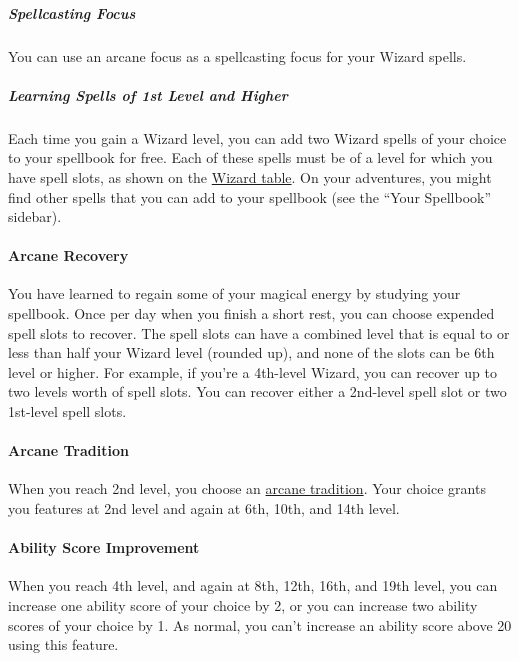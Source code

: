 \subparagraph{Spellcasting Focus}\label{_spellcasting_focus_3}

You can use an arcane focus as a spellcasting focus for your Wizard
spells.

\subparagraph{Learning Spells of 1st Level and
Higher}\label{_learning_spells_of_1st_level_and_higher}

Each time you gain a Wizard level, you can add two Wizard spells of your
choice to your spellbook for free. Each of these spells must be of a
level for which you have spell slots, as shown on the
\hyperref[wizard-table]{Wizard table}. On your adventures, you might
find other spells that you can add to your spellbook (see the ``Your
Spellbook'' sidebar).

\paragraph{Arcane Recovery}\label{wizard-feature-arcane-recovery}

You have learned to regain some of your magical energy by studying your
spellbook. Once per day when you finish a short rest, you can choose
expended spell slots to recover. The spell slots can have a combined
level that is equal to or less than half your Wizard level (rounded up),
and none of the slots can be 6th level or higher. For example, if you're
a 4th-level Wizard, you can recover up to two levels worth of spell
slots. You can recover either a 2nd-level spell slot or two 1st-level
spell slots.

\paragraph{Arcane Tradition}\label{wizard-feature-arcane-tradition}

When you reach 2nd level, you choose an
\hyperref[wizard-subclasses]{arcane tradition}. Your choice grants you
features at 2nd level and again at 6th, 10th, and 14th level.

\paragraph{Ability Score Improvement}\label{wizard-feature-asi}

When you reach 4th level, and again at 8th, 12th, 16th, and 19th level,
you can increase one ability score of your choice by 2, or you can
increase two ability scores of your choice by 1. As normal, you can't
increase an ability score above 20 using this feature.

